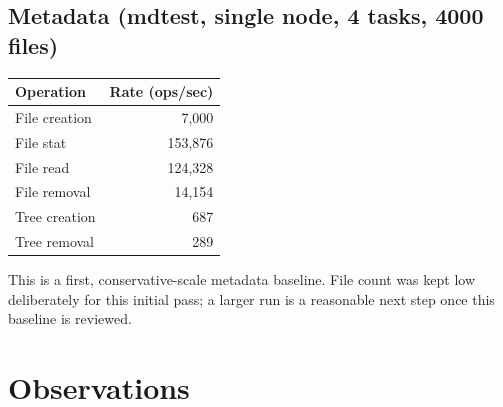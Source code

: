 \documentclass[11pt]{article}
\begin{document}
\subsection*{Metadata (mdtest, single node, 4 tasks, 4000 files)}

\begin{center}
\begin{tabular}{lr}
\toprule
Operation & Rate (ops/sec) \\
\midrule
File creation & 7{,}000 \\
File stat & 153{,}876 \\
File read & 124{,}328 \\
File removal & 14{,}154 \\
Tree creation & 687 \\
Tree removal & 289 \\
\bottomrule
\end{tabular}
\end{center}

This is a first, conservative-scale metadata baseline. File count was kept low deliberately for this initial pass; a larger run is a reasonable next step once this baseline is reviewed.

\section*{Observations}
\end{document}
